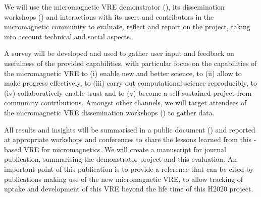 \begin{workpackage}[id=social-aspects,wphases=0-48,
  title=Social Aspects,
  lead=UO,
  UORM=53,USHRM=8, USORM=6]
\begin{tasklist}
\begin{task}[title=Evaluation of Micromagnetic VRE,lead=USO,PM=6,id=oommf-nb-evaluation]
  We will use the micromagnetic VRE demonstrator
  (), its dissemination
  workshops \linebreak()
  and interactions with its users and contributors in the
  micromagnetic community to evaluate, reflect and report on the project,
  taking into account technical and social aspects.

  A survey will be developed and used to gather user input and
  feedback on usefulness of the provided capabilities, with particular
  focus on the capabilities of the micromagnetic VRE to (i) enable new
  and better science, to (ii) allow to make progress effectively, to
  (iii) carry out computational science reproducibly, to (iv)
  collaboratively enable trust and to (v) become a self-sustained
  project from community contributions. Amongst other channels, we
  will target attendees of the micromagnetic VRE dissemination
  workshops () to
  gather data.

  All results and insights will be summarised in a public document
  () and reported at appropriate
  workshops and conferences to share the lessons learned from this
  \Jupyter-based VRE for micromagnetics. We will create a manuscript
  for journal publication, summarising the demonstrator project and
  this evaluation. An important point of this publication is to
  provide a reference that can be cited by publications making use of
  the new micromagnetic VRE, to allow tracking of uptake and
  development of this VRE beyond the life time of this H2020 project.
\end{task}



\end{tasklist}



\end{workpackage}
